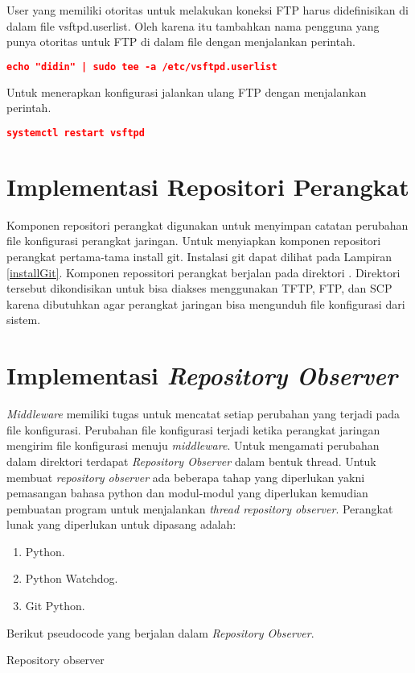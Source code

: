         \indent User yang memiliki otoritas untuk melakukan koneksi FTP harus didefinisikan di dalam file vsftpd.userlist. Oleh karena itu tambahkan nama pengguna yang punya otoritas untuk FTP di dalam file  dengan menjalankan perintah.
    \begin{lstlisting}[frame=single,tabsize=2,breaklines,caption={Pengguna FTP},label=nonrootuser, captionpos=b, language=json,numbers=none]
    echo "didin" | sudo tee -a /etc/vsftpd.userlist
    \end{lstlisting}
        Untuk menerapkan konfigurasi jalankan ulang FTP dengan menjalankan perintah.
    \begin{lstlisting}[frame=single,tabsize=2,breaklines,caption={Jalan ulang FTP},label=nonrootuser, captionpos=b, language=json,numbers=none]
    systemctl restart vsftpd
    \end{lstlisting}
    
    \section{Implementasi Repositori Perangkat}
    Komponen repositori perangkat digunakan untuk menyimpan catatan perubahan file konfigurasi perangkat jaringan. Untuk menyiapkan komponen repositori perangkat pertama-tama install git. Instalasi git dapat dilihat pada Lampiran \ref{installGit}. Komponen repossitori perangkat berjalan pada direktori . Direktori tersebut dikondisikan untuk bisa diakses menggunakan TFTP, FTP, dan SCP karena dibutuhkan agar perangkat jaringan bisa mengunduh file konfigurasi dari sistem.
   
   	\section{Implementasi \textit{Repository Observer}}
   		\textit{Middleware} memiliki tugas untuk mencatat setiap perubahan yang terjadi pada file konfigurasi. Perubahan file konfigurasi terjadi ketika perangkat jaringan mengirim file konfigurasi menuju \textit{middleware}. Untuk mengamati perubahan dalam direktori terdapat \textit{Repository Observer} dalam bentuk thread. Untuk membuat \textit{repository observer} ada beberapa tahap yang diperlukan yakni pemasangan bahasa python dan modul-modul yang diperlukan kemudian pembuatan program untuk menjalankan \textit{thread repository observer}. Perangkat lunak yang diperlukan untuk dipasang adalah:
   			\begin{enumerate}
   				\item Python.
   				\item Python Watchdog.
   				\item Git Python.
   			\end{enumerate}	
   		  Berikut pseudocode yang berjalan dalam \textit{Repository Observer}.
   		\begin{algorithm}[H]
   			\caption{Repository observer}
   		\end{algorithm}
